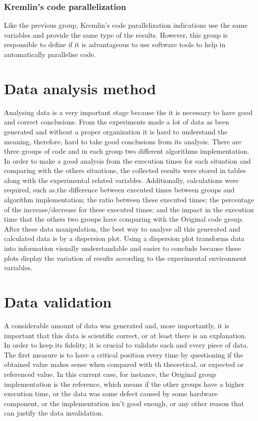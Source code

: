 \subsubsection{Kremlin's code parallelization}

Like the previous group, Kremlin's code parallelization indications use the same variables and provide the same type of the results. However, this group is responsible to define if it is advantageous to use software tools to help in automatically parallelise code. 


\section{Data analysis method}

Analysing data is a very important stage because the it is necessary to have good and correct conclusions. From the experiments made a lot of data as been generated and without a proper organization it is hard to understand the meaning, therefore, hard to take good conclusions from its analysis. There are three groups of code and in each group two different algorithms implementation. In order to make a good analysis from the execution times for each situation and comparing with the others situations, the collected results were stored in tables along with the experimental related variables. Additionally, calculations were required, such as,the difference between executed times between groups and algorithm implementation; the ratio between these executed times; the percentage of the increase/decrease for these executed times; and the impact in the execution time that the others two groups have comparing with the Original code group. After these data manipulation, 
the best way to analyse all this generated and calculated data is by a dispersion plot. Using a dispersion plot transforms data into information visually understandable and easier to conclude because these plots display the variation of results according to the experimental environment variables.


\section{Data validation}

A considerable amount of data was generated and, more importantly, it is important that this data is scientific correct, or at least there is an explanation. In order to keep its fidelity, it is crucial to validate each and every piece of data. The first measure is to have a critical position every time by questioning if the obtained value makes sense when compared with th theoretical, or expected or referenced value. In this current case, for instance, the Original group implementation is the reference, which means if the other groups have a higher execution time, or the data was some defect caused by some hardware component, or the implementation isn't good enough, or any other reason that can justify the data invalidation.

